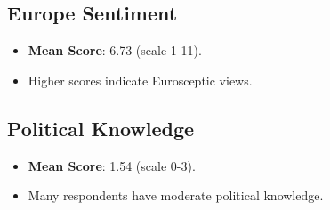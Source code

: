 \documentclass[12pt]{article}
\begin{document}
\subsection{Europe Sentiment}
\begin{itemize}
    \item \textbf{Mean Score}: 6.73 (scale 1-11).
    \item Higher scores indicate Eurosceptic views.
\end{itemize}

\subsection{Political Knowledge}
\begin{itemize}
    \item \textbf{Mean Score}: 1.54 (scale 0-3).
    \item Many respondents have moderate political knowledge.
\end{itemize}
\end{document}
